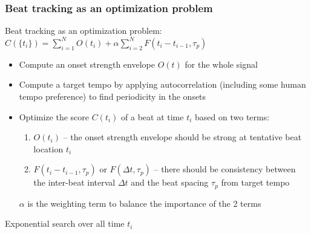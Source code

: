 \documentclass{beamer}
\begin{document}

\begin{frame}
	\frametitle{Beat tracking as an optimization problem}
	Beat tracking as an optimization problem: $C(\{t_{i}\}) = \sum_{i=1}^{N}O(t_{i}) + \alpha\sum_{i=2}^{N}F(t_{i}-t_{i-1}, \tau_{p})$\\
	\vspace{1em}
	\begin{itemize}
		\item
			Compute an onset strength envelope $O(t)$ for the whole signal
		\item
			Compute a target tempo by applying autocorrelation (including some human tempo preference) to find periodicity in the onsets
		\item
			Optimize the score $C(t_{i})$ of a beat at time $t_{i}$ based on two terms:
			\begin{enumerate}
				\item
					$O(t_{i})$ -- the onset strength envelope should be strong at tentative beat location $t_{i}$
				\item
					$F(t_{i}-t_{i-1}, \tau_{p})$ or $F(\Delta t, \tau_{p})$ -- there should be consistency between the inter-beat interval $\Delta t$ and the beat spacing $\tau_{p}$ from target tempo
			\end{enumerate}
			$\alpha$ is the weighting term to balance the importance of the 2 terms
	\end{itemize}
	Exponential search over all time $t_{i}$
\end{frame}

\end{document}
